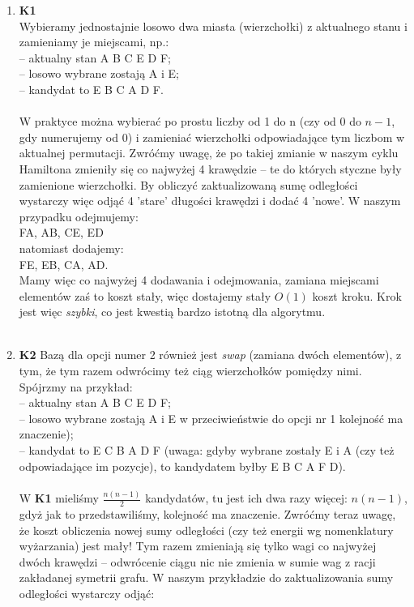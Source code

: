 \documentclass[a4paper]{article}
\theoremstyle{defn}
\theoremstyle{theorem}
\theoremstyle{lemma}
\theoremstyle{cor}
\theoremstyle{fact}
\begin{document}
\begin{enumerate}
\item \textbf{K1}\\
Wybieramy jednostajnie losowo dwa miasta (wierzchołki) z aktualnego stanu i zamieniamy je miejscami, np.:\\
– aktualny stan A B C E D F;\\
– losowo wybrane zostają A i E;\\
– kandydat to E B C A D F.\\\\
W praktyce można wybierać po prostu liczby od 1 do n (czy od 0 do $n-1$, gdy numerujemy od $0$) i zamieniać wierzchołki odpowiadające tym liczbom w aktualnej permutacji. Zwróćmy uwagę, że po takiej zmianie w naszym cyklu Hamiltona zmieniły się co najwyżej 4 krawędzie – te do których styczne były zamienione wierzchołki. By obliczyć zaktualizowaną sumę odległości wystarczy więc odjąć 4 'stare' długości krawędzi i dodać 4 'nowe'. W naszym przypadku odejmujemy:\\
FA, AB, CE, ED\\
natomiast dodajemy:\\
FE, EB, CA, AD.\\
Mamy więc co najwyżej 4 dodawania i odejmowania, zamiana miejscami elementów zaś to koszt stały, więc dostajemy stały $O(1)$ koszt kroku. Krok jest więc \textit{szybki}, co jest kwestią bardzo istotną dla algorytmu.\\\\
\item \textbf{K2}
Bazą dla opcji numer 2 również jest \textit{swap} (zamiana dwóch elementów), z tym, że tym razem odwrócimy też ciąg wierzchołków pomiędzy nimi. Spójrzmy na przykład:\\
– aktualny stan A B C E D F;\\
– losowo wybrane zostają A i E w przeciwieństwie do opcji nr 1 kolejność ma znaczenie);\\
– kandydat to E C B A D F (uwaga: gdyby wybrane zostały E i A (czy też odpowiadające im pozycje), to kandydatem byłby E B C A F D).\\\\
W \textbf{K1} mieliśmy $\frac{n(n-1)}{2}$ kandydatów, tu jest ich dwa razy więcej: $n(n-1)$, gdyż jak to przedstawiliśmy, kolejność ma znaczenie. Zwróćmy teraz uwagę, że koszt obliczenia nowej sumy odległości (czy też energii wg nomenklatury wyżarzania) jest mały! Tym razem zmieniają się tylko wagi co najwyżej dwóch krawędzi – odwrócenie ciągu nic nie zmienia w sumie wag z racji zakładanej symetrii grafu. W naszym przykładzie do zaktualizowania sumy odległości wystarczy odjąć:\\

\end{enumerate}
\end{document}

